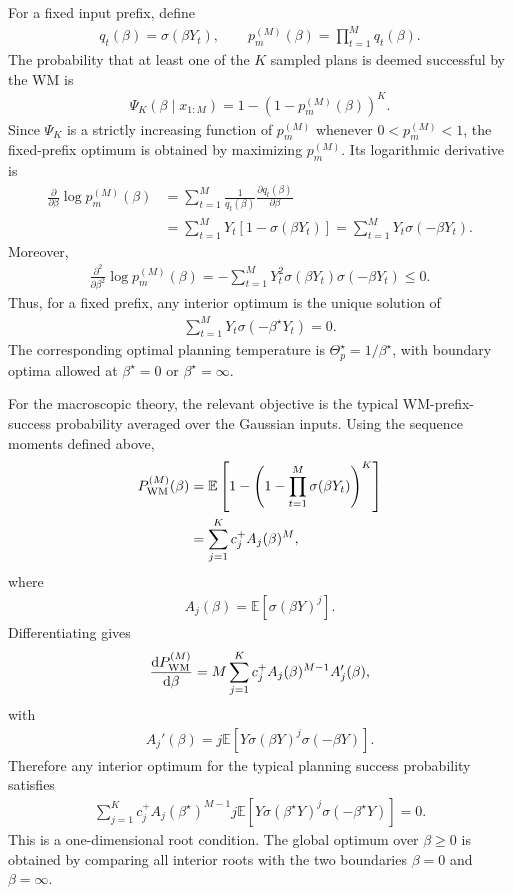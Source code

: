 \documentclass{article}
\newcommand*\dd{\mathrm d}
\begin{document}
For a fixed input prefix, define
\begin{align}
q_t(\beta)=\sigma(\beta Y_t), \qquad p_m^{(M)}(\beta)=\prod_{t=1}^M q_t(\beta).
\end{align}
The probability that at least one of the $K$ sampled plans is deemed successful by the WM is
\begin{align}
\Psi_K(\beta\mid x_{1:M}) =1-\left(1-p_m^{(M)}(\beta)\right)^K.
\end{align}
Since $\Psi_K$ is a strictly increasing function of $p_m^{(M)}$ whenever $0<p_m^{(M)}<1$, the fixed-prefix optimum is obtained by maximizing $p_m^{(M)}$. Its logarithmic derivative is
\begin{align}
\frac{\partial}{\partial\beta}\log p_m^{(M)}(\beta) &= \sum_{t=1}^M \frac{1}{q_t(\beta)} \frac{\partial q_t(\beta)}{\partial\beta}  \\
&= \sum_{t=1}^M Y_t\left[1-\sigma(\beta Y_t)\right] = \sum_{t=1}^M Y_t\sigma(-\beta Y_t).
\end{align}
Moreover,
\begin{align}
\frac{\partial^2}{\partial\beta^2}\log p_m^{(M)}(\beta) = -\sum_{t=1}^M Y_t^2\sigma(\beta Y_t)\sigma(-\beta Y_t) \leq 0.
\end{align}
Thus, for a fixed prefix, any interior optimum is the unique solution of
\begin{align}
\boxed{ \sum_{t=1}^M Y_t\sigma(-\beta^\star Y_t)=0. }
\end{align}
The corresponding optimal planning temperature is $\Theta_p^\star=1/\beta^\star$, with boundary optima allowed at $\beta^\star=0$ or $\beta^\star=\infty$.

For the macroscopic theory, the relevant objective is the typical WM-prefix-success probability averaged over the Gaussian inputs. Using the sequence moments defined above,
\begin{align}
P_{\rm WM}^{(M)}(\beta) &= \mathbb E\left[ 1-\left(1-\prod_{t=1}^M\sigma(\beta Y_t)\right)^K \right] \\
&= \sum_{j=1}^K c_j^+ A_j(\beta)^M,
\end{align}
where
\begin{align}
A_j(\beta)=\mathbb E\left[\sigma(\beta Y)^j\right].
\end{align}
Differentiating gives
\begin{align}
\frac{\dd P_{\rm WM}^{(M)}}{\dd\beta} = M\sum_{j=1}^K c_j^+ A_j(\beta)^{M-1} A_j'(\beta),
\end{align}
with
\begin{align}
A_j'(\beta) = j\mathbb E\left[ Y\sigma(\beta Y)^j\sigma(-\beta Y) \right].
\end{align}
Therefore any interior optimum for the typical planning success probability satisfies
\begin{align}
\boxed{ \sum_{j=1}^K c_j^+ A_j(\beta^\star)^{M-1} j\mathbb E\left[ Y\sigma(\beta^\star Y)^j\sigma(-\beta^\star Y) \right] =0. }
\end{align}
This is a one-dimensional root condition. The global optimum over $\beta\geq 0$ is obtained by comparing all interior roots with the two boundaries $\beta=0$ and $\beta=\infty$.
\end{document}
